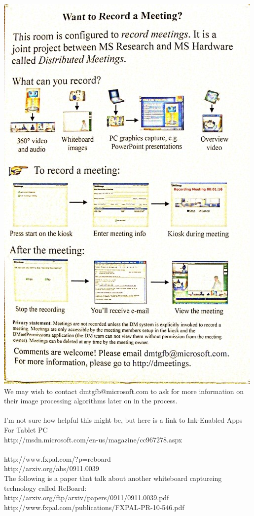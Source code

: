 \documentclass[]{article}
\begin{document}
			\includegraphics{images/WhiteboardIt2.jpg}\\
			
			We may wish to contact dmtgfb@microsoft.com to ask for more information on their image processing algorithms later on in the process.\\
			\\
			I’m not sure how helpful this might be, but here is a link to Ink-Enabled Apps For Tablet PC\\
			http://msdn.microsoft.com/en-us/magazine/cc967278.aspx\\
			\\
			http://www.fxpal.com/?p=reboard\\
			http://arxiv.org/abs/0911.0039\\
			The following is a paper that talk about another whiteboard captureing technology called ReBoard:\\
			http://arxiv.org/ftp/arxiv/papers/0911/0911.0039.pdf\\
			http://www.fxpal.com/publications/FXPAL-PR-10-546.pdf\\
			
\end{document}
